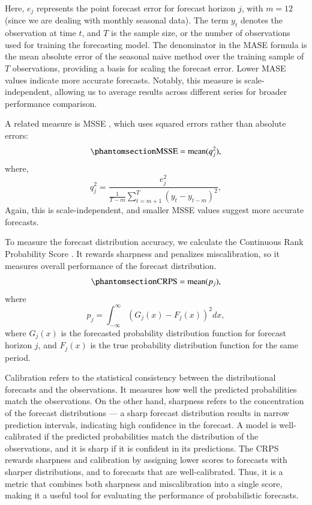 \documentclass[
  authoryear,
  preprint,
  3p]{elsarticle}
\begin{document}
Here, \(e_{j}\) represents the point forecast error for forecast horizon
\(j\), with \(m = 12\) (since we are dealing with monthly seasonal
data). The term \(y_t\) denotes the observation at time \(t\), and \(T\)
is the sample size, or the number of observations used for training the
forecasting model. The denominator in the MASE formula is the mean
absolute error of the seasonal naive method over the training sample of
\(T\) observations, providing a basis for scaling the forecast error.
Lower MASE values indicate more accurate forecasts. Notably, this
measure is scale-independent, allowing us to average results across
different series for broader performance comparison.

A related measure is MSSE
\citep{hyndman2021forecasting, makridakis2022m5}, which uses squared
errors rather than absolute errors:
\begin{equation}\phantomsection\label{eq-RMSSE}{
  \text{MSSE} = \text{mean}(q_{j}^2),
}\end{equation} where, \[
  q^2_{j} = \frac{ e^2_{j}}
 {\displaystyle\frac{1}{T-m}\sum_{t=m+1}^T (y_{t}-y_{t-m})^2},
\] Again, this is scale-independent, and smaller MSSE values suggest
more accurate forecasts.

To measure the forecast distribution accuracy, we calculate the
Continuous Rank Probability Score \citep{hyndman2021forecasting}. It
rewards sharpness and penalizes miscalibration, so it measures overall
performance of the forecast distribution.
\begin{equation}\phantomsection\label{eq-CRPS}{
  \text{CRPS} = \text{mean}(p_j),
}\end{equation} where \[
  p_j = \int_{-\infty}^{\infty} \left(G_j(x) - F_j(x)\right)^2dx,
\] where \(G_j(x)\) is the forecasted probability distribution function
for forecast horizon \(j\), and \(F_j(x)\) is the true probability
distribution function for the same period.

Calibration refers to the statistical consistency between the
distributional forecasts and the observations. It measures how well the
predicted probabilities match the observations. On the other hand,
sharpness refers to the concentration of the forecast distributions ---
a sharp forecast distribution results in narrow prediction intervals,
indicating high confidence in the forecast. A model is well-calibrated
if the predicted probabilities match the distribution of the
observations, and it is sharp if it is confident in its predictions. The
CRPS rewards sharpness and calibration by assigning lower scores to
forecasts with sharper distributions, and to forecasts that are
well-calibrated. Thus, it is a metric that combines both sharpness and
miscalibration into a single score, making it a useful tool for
evaluating the performance of probabilistic forecasts.
\end{document}
